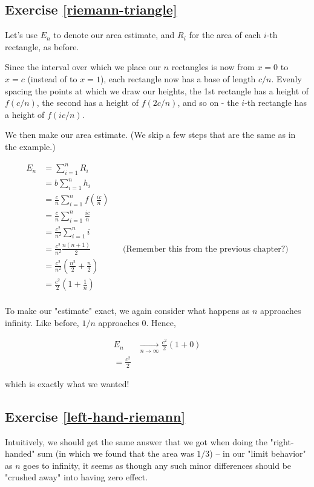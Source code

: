 \documentclass{article}
\begin{document}
\subsection{Exercise \ref{riemann-triangle}}

Let's use $E_n$ to denote our area estimate, and $R_i$ for the area of each $i$-th rectangle, as before. 

Since the interval over which we place our $n$ rectangles is now from $x = 0$ to $x = c$ (instead of to $x = 1$), each rectangle now has a base of length $c/n$. Evenly spacing the points at which we draw our heights, the 1st rectangle has a height of $f(c/n)$, the second has a height of $f(2c/n)$, and so on - the $i$-th rectangle has a height of $f(ic/n)$. 

We then make our area estimate. (We skip a few steps that are the same as in the example.)

\begin{align*}
E_n &= \sum_{i=1}^n R_i \\
&= b \sum_{i=1}^n h_i \\
&= \frac{c}{n} \sum_{i=1}^n f(\frac{ic}{n}) \\
&= \frac{c}{n} \sum_{i=1}^n \frac{ic}{n} \\
&= \frac{c^2}{n^2} \sum_{i=1}^n i \\
&= \frac{c^2}{n^2} \frac{n(n+1)}{2} && \text{(Remember this from the previous chapter?)} \\
&= \frac{c^2}{n^2} \left( \frac{n^2}{2} + \frac{n}{2} \right) \\
&= \frac{c^2}{2} \left( 1 + \frac{1}{n} \right) \\
\end{align*}

To make our "estimate" exact, we again consider what happens as $n$ approaches infinity. Like before, $1/n$ approaches 0. Hence,

\begin{align*}
E_n &\xrightarrow[n \to \infty]{} \frac{c^2}{2} \left( 1 + 0 \right)  \\
= \frac{c^2}{2}
\end{align*}

which is exactly what we wanted!


\subsection{Exercise \ref{left-hand-riemann}}

Intuitively, we should get the same answer that we got when doing the "right-handed" sum (in which we found that the area was $1/3$) -- in our "limit behavior" as $n$ goes to infinity, it seems as though any such minor differences should be "crushed away" into having zero effect. 
\end{document}
